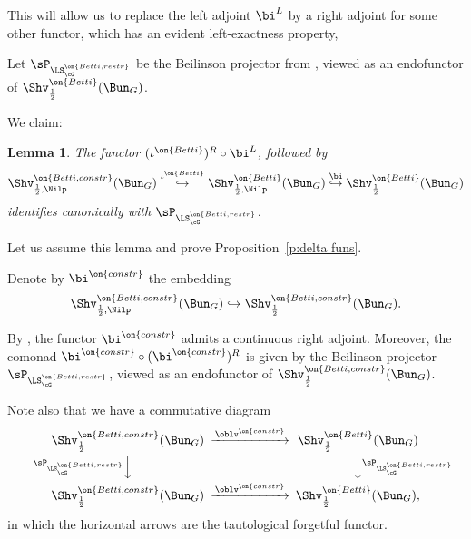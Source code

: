 \documentclass[9pt]{amsart}
\newtheorem{lem}[subsubsection]{Lemma}
\theoremstyle{remark}
\theoremstyle{definition}
\theoremstyle{remark}
\newcommand{\propref}[1]{Proposition~\ref{#1}}
\numberwithin{equation}{section}
\begin{document}
This will allow us to replace the left adjoint $\bi^L$ by a right adjoint
for some other functor, which has an evident left-exactness property, 

\sssec{}

Let $\sP_{\LS^{\on{Betti,restr}}_\cG}$ be the Beilinson projector from \cite[Sect. 15.4.5]{AGKRRV},
viewed as an endofunctor of $\Shv^{\on{Betti}}_{\frac{1}{2}}(\Bun_G)$. 

\medskip

We claim:

\begin{lem} \label{l:Beil}
The functor $(\iota^{\on{Betti}})^R\circ \bi^L$, followed by
$$\Shv^{\on{Betti,constr}}_{\frac{1}{2},\Nilp}(\Bun_G)\overset{\iota^{\on{Betti}}}\hookrightarrow 
\Shv^{\on{Betti}}_{\frac{1}{2},\Nilp}(\Bun_G)\overset{\bi}\hookrightarrow \Shv^{\on{Betti}}_{\frac{1}{2}}(\Bun_G)$$
identifies canonically with $\sP_{\LS^{\on{Betti,restr}}_\cG}$.
\end{lem}

Let us assume this lemma and prove \propref{p:delta funs}. 

\sssec{}

Denote by $\bi^{\on{constr}}$ the embedding
$$\Shv^{\on{Betti,constr}}_{\frac{1}{2},\Nilp}(\Bun_G)\hookrightarrow \Shv^{\on{Betti,constr}}_{\frac{1}{2}}(\Bun_G).$$

By \cite[Theorem 16.4.10 and Proposition 17.2.3]{AGKRRV}, the functor $\bi^{\on{constr}}$ admits a continuous right
adjoint. Moreover, the comonad $\bi^{\on{constr}}\circ (\bi^{\on{constr}})^R$ is given by the Beilinson projector 
$\sP_{\LS^{\on{Betti,restr}}_\cG}$, viewed as an endofunctor of $\Shv^{\on{Betti,constr}}_{\frac{1}{2}}(\Bun_G)$. 

\medskip

Note also that we have a commutative diagram
$$
\CD
\Shv^{\on{Betti,constr}}_{\frac{1}{2}}(\Bun_G) @>{\oblv^{\on{constr}}}>> \Shv^{\on{Betti}}_{\frac{1}{2}}(\Bun_G) \\
@V{\sP_{\LS^{\on{Betti,restr}}_\cG}}VV @VV{\sP_{\LS^{\on{Betti,restr}}_\cG}}V \\
\Shv^{\on{Betti,constr}}_{\frac{1}{2}}(\Bun_G) @>{\oblv^{\on{constr}}}>> \Shv^{\on{Betti}}_{\frac{1}{2}}(\Bun_G), 
\endCD
$$
in which the horizontal arrows are the tautological forgetful functor. 
\end{document}
